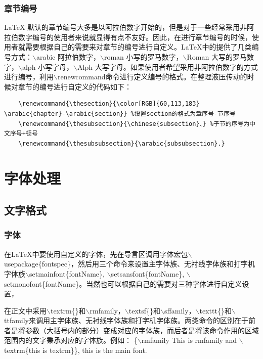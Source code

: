 \documentclass[12pt]{book}
\begin{document}
\subsection{章节编号}

\LaTeX{} 默认的章节编号大多是以阿拉伯数字开始的，但是对于一些经常采用非阿拉伯数字编号的使用者来说就显得有点不友好。因此，在进行章节编号的时候，使用者就需要根据自己的需要来对章节的编号进行自定义。\LaTeX{}中的提供了几类编号方式：$\backslash$arabic 阿拉伯数字，$\backslash$roman 小写的罗马数字，$\backslash$Roman 大写的罗马数字，$\backslash$alph 小写字母，$\backslash$Alph 大写字母。如果使用者希望采用非阿拉伯数字的方式进行编号，利用$\backslash$renewcommand命令进行定义编号的格式。在整理液压传动的时候对章节的编号进行自定义的代码如下：

\begin{verbatim}
    \renewcommand{\thesection}{\color[RGB]{60,113,183} \arabic{chapter}-\arabic{section}} %设置section的格式为章序号-节序号
    \renewcommand{\thesubsection}{\chinese{subsection}、} %子节的序号为中文序号+顿号
    \renewcommand{\thesubsubsection}{\arabic{subsubsection}.} 
\end{verbatim}

\chapter{字体处理}



\section{文字格式}

\subsection{字体}

在\LaTeX{}中要使用自定义的字体，先在导言区调用字体宏包$\backslash$usepackage\{fontspec\}，然后用三个命令来设置主字体族、无衬线字体族和打字机字体族$\backslash$setmainfont\{fontName\}, $\backslash$setsansfont\{fontName\}, $\backslash$setmonofont\{fontName\}。当然也可以根据自己的需要对三种字体进行自定义设置，


在正文中采用$\backslash$textrm\{\}和$\backslash$rmfamily，$\backslash$textsf\{\}和$\backslash$sffamily，$\backslash$texttt\{\}和$\backslash$ttfamily来调用主字体族、无衬线字体族和打字机字体族。两类命令的区别在于前者是将参数（大括号内的部分）变成对应的字体族，而后者是将该命令作用的区域范围内的文字秉承对应的字体族。例如：
\{$\backslash$rmfamily This is rmfamily and $\backslash$textrm\{this is textrm\}\}, this is the main font.
\end{document}
